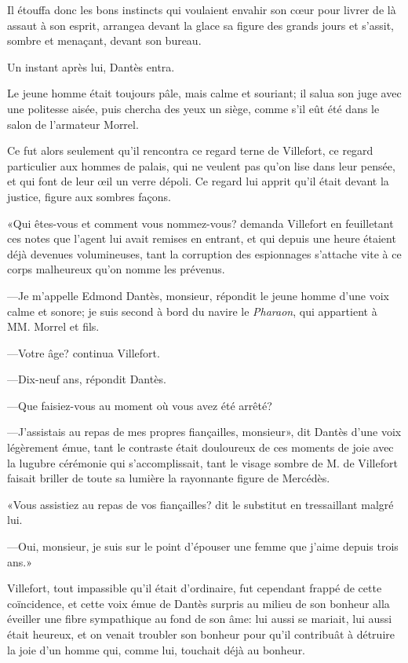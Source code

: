 Il étouffa donc les bons instincts qui voulaient envahir son cœur pour livrer de là assaut à son esprit, arrangea devant la glace sa figure des grands jours et s'assit, sombre et menaçant, devant son bureau.

Un instant après lui, Dantès entra.

Le jeune homme était toujours pâle, mais calme et souriant; il salua son juge avec une politesse aisée, puis chercha des yeux un siège, comme s'il eût été dans le salon de l'armateur Morrel.

Ce fut alors seulement qu'il rencontra ce regard terne de Villefort, ce regard particulier aux hommes de palais, qui ne veulent pas qu'on lise dans leur pensée, et qui font de leur œil un verre dépoli. Ce regard lui apprit qu'il était devant la justice, figure aux sombres façons.

«Qui êtes-vous et comment vous nommez-vous? demanda Villefort en feuilletant ces notes que l'agent lui avait remises en entrant, et qui depuis une heure étaient déjà devenues volumineuses, tant la corruption des espionnages s'attache vite à ce corps malheureux qu'on nomme les prévenus.

—Je m'appelle Edmond Dantès, monsieur, répondit le jeune homme d'une voix calme et sonore; je suis second à bord du navire le \textit{Pharaon}, qui appartient à MM. Morrel et fils.

—Votre âge? continua Villefort.

—Dix-neuf ans, répondit Dantès.

—Que faisiez-vous au moment où vous avez été arrêté?

—J'assistais au repas de mes propres fiançailles, monsieur», dit Dantès d'une voix légèrement émue, tant le contraste était douloureux de ces moments de joie avec la lugubre cérémonie qui s'accomplissait, tant le visage sombre de M. de Villefort faisait briller de toute sa lumière la rayonnante figure de Mercédès.

«Vous assistiez au repas de vos fiançailles? dit le substitut en tressaillant malgré lui.

—Oui, monsieur, je suis sur le point d'épouser une femme que j'aime depuis trois ans.»

Villefort, tout impassible qu'il était d'ordinaire, fut cependant frappé de cette coïncidence, et cette voix émue de Dantès surpris au milieu de son bonheur alla éveiller une fibre sympathique au fond de son âme: lui aussi se mariait, lui aussi était heureux, et on venait troubler son bonheur pour qu'il contribuât à détruire la joie d'un homme qui, comme lui, touchait déjà au bonheur.

